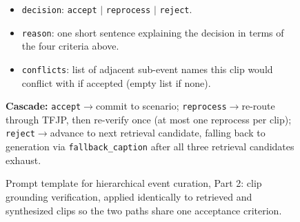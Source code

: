 \documentclass{llmxive}
\begin{document}
\begin{figure}[!htbp]
\begin{tcolorbox}
\begin{itemize}
  \item \texttt{decision}: \texttt{accept} $|$ \texttt{reprocess} $|$ \texttt{reject}.
  \item \texttt{reason}: one short sentence explaining the decision in
        terms of the four criteria above.
  \item \texttt{conflicts}: list of adjacent sub-event names this clip
        would conflict with if accepted (empty list if none).
\end{itemize}
\textbf{Cascade:} \texttt{accept}$\to$commit to scenario;
\texttt{reprocess}$\to$re-route through TFJP, then re-verify once
(at most one reprocess per clip); \texttt{reject}$\to$advance to next
retrieval candidate, falling back to generation via
\texttt{fallback\_caption} after all three retrieval candidates exhaust.
\end{tcolorbox}
\caption{Prompt template for hierarchical event curation, Part 2: clip
grounding verification, applied identically to retrieved and synthesized
clips so the two paths share one acceptance criterion.}
\label{prompt:curation-p2}
\end{figure}

\end{document}
